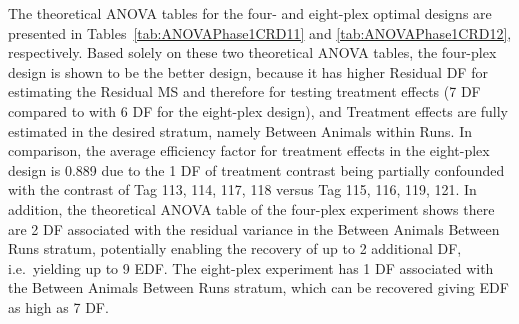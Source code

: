 The theoretical ANOVA tables for the four- and eight-plex optimal designs are presented in Tables~\ref{tab:ANOVAPhase1CRD11} and \ref{tab:ANOVAPhase1CRD12}, respectively. Based solely on these two theoretical ANOVA tables, the four-plex design is shown to be the better design, because it has higher Residual DF for estimating the Residual MS and therefore for testing treatment effects (7 DF compared to with 6 DF for the eight-plex design), and Treatment effects are fully estimated in the desired stratum, namely Between Animals within Runs. In comparison, the average efficiency factor for treatment effects in the eight-plex design is 0.889 due to the 1 DF of treatment contrast being partially confounded with the contrast of Tag 113, 114, 117, 118 versus Tag 115, 116, 119, 121. In addition, the theoretical ANOVA table of the four-plex experiment shows there are 2 DF associated with the residual variance in the Between Animals Between Runs stratum, potentially enabling the recovery of up to 2 additional DF, i.e.\ yielding up to 9 EDF. The eight-plex experiment has 1 DF associated with the Between Animals Between Runs stratum, which can be recovered giving EDF as high as 7 DF.  

